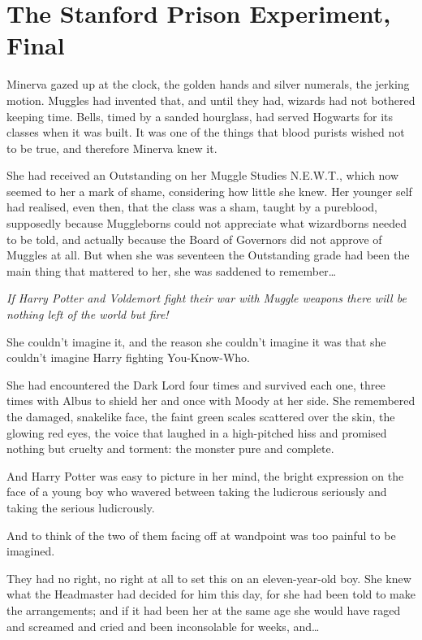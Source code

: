 \chapter{The Stanford Prison Experiment,
Final}\label{the-stanford-prison-experiment-final}

Minerva gazed up at the clock, the golden hands and silver numerals, the
jerking motion. Muggles had invented that, and until they had, wizards
had not bothered keeping time. Bells, timed by a sanded hourglass, had
served Hogwarts for its classes when it was built. It was one of the
things that blood purists wished not to be true, and therefore Minerva
knew it.

She had received an Outstanding on her Muggle Studies N.E.W.T., which
now seemed to her a mark of shame, considering how little she knew. Her
younger self had realised, even then, that the class was a sham, taught
by a pureblood, supposedly because Muggleborns could not appreciate what
wizardborns needed to be told, and actually because the Board of
Governors did not approve of Muggles at all. But when she was seventeen
the Outstanding grade had been the main thing that mattered to her, she
was saddened to remember\ldots{}

\emph{If Harry Potter and Voldemort fight their war with Muggle weapons
there will be nothing left of the world but fire!}

She couldn't imagine it, and the reason she couldn't imagine it was that
she couldn't imagine Harry fighting You-Know-Who.

She had encountered the Dark Lord four times and survived each one,
three times with Albus to shield her and once with Moody at her side.
She remembered the damaged, snakelike face, the faint green scales
scattered over the skin, the glowing red eyes, the voice that laughed in
a high-pitched hiss and promised nothing but cruelty and torment: the
monster pure and complete.

And Harry Potter was easy to picture in her mind, the bright expression
on the face of a young boy who wavered between taking the ludicrous
seriously and taking the serious ludicrously.

And to think of the two of them facing off at wandpoint was too painful
to be imagined.

They had no right, no right at all to set this on an eleven-year-old
boy. She knew what the Headmaster had decided for him this day, for she
had been told to make the arrangements; and if it had been her at the
same age she would have raged and screamed and cried and been
inconsolable for weeks, and\ldots{}

